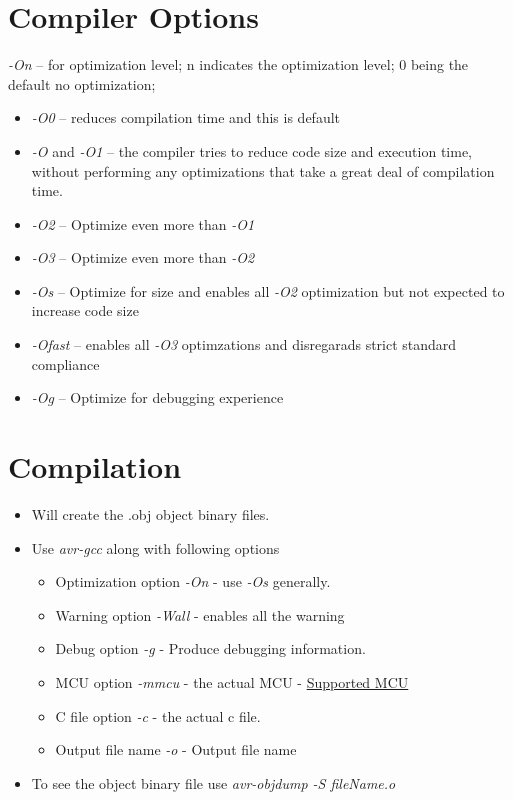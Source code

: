 \documentclass{article}
\begin{document}
\section{Compiler Options} \label{optimization}
\emph{-On} -- for optimization level; n indicates the optimization level; 0 being the default no optimization; 
\begin{itemize}
    \item \emph{-O0} -- reduces compilation time and this is default
    \item \emph{-O} and \emph{-O1} -- the compiler tries to reduce code size and execution time, without performing any optimizations that take a great deal of compilation time.
    \item \emph{-O2} --  Optimize even more than \emph{-O1}
    \item \emph{-O3} --  Optimize even more than \emph{-O2}
    \item \emph{-Os} -- Optimize for size and enables all \emph{-O2} optimization but not expected to increase code size
    \item \emph{-Ofast} -- enables all \emph{-O3} optimzations and disregarads strict standard compliance
    \item \emph{-Og} -- Optimize for debugging experience
\end{itemize}


\section{Compilation} 
\begin{itemize}
    \item Will create the .obj object binary files.
    \item Use \emph{avr-gcc} along with following options
    \begin{itemize}
        \item Optimization option \emph{-On} - use \emph{-Os} generally.
        \item Warning option \emph{-Wall} - enables all the warning
        \item Debug option \emph{-g} - Produce debugging information.
        \item MCU option \emph{-mmcu} - the actual MCU - \href{https://www.nongnu.org/avr-libc/user-manual/#supp_devices}{Supported MCU}
        \item C file option \emph{-c} - the actual c file.
        \item Output file name \emph{-o} - Output file name
    \end{itemize}
    \item To see the object binary file use \emph{avr-objdump -S fileName.o}
\end{itemize}
\end{document}
